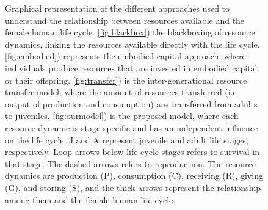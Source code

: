 \documentclass{article}
\begin{document}
\begin{figure}
    \caption{Graphical representation of the different approaches used to understand the relationship between resources available and the female human life cycle. \ref{fig:blackbox}) the blackboxing of resource dynamics, linking the resources available directly with the life cycle. \ref{fig:embodied}) represents the embodied capital approach, where individuals produce resources that are invested in embodied capital or their offspring. \ref{fig:transfer}) is the inter-generational resource transfer model, where the amount of resources transferred (i.e output of production and consumption) are transferred from adults to juveniles. \ref{fig:ourmodel}) is the proposed model, where each resource dynamic is stage-specific and has an independent influence on the life cycle. J and A represent juvenile and adult life stages, respectively. Loop arrows below life cycle stages refers to survival in that stage. The dashed arrows refers to reproduction.  The resource dynamics are production (P), consumption (C), receiving (R), giving (G), and storing (S), and the thick arrows represent the relationship among them and the female human life cycle.}
    \label{fig:1}
    
\end{figure}
\end{document}
